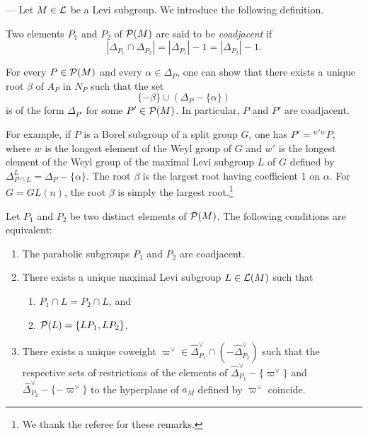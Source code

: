 \begin{paragr} --- Let $M\in \mathcal{L}$ be a Levi subgroup. We introduce the following definition.

\begin{definition}\label{def:coadj}
    Two elements $P_1$ and $P_2$ of $\mathcal{P}(M)$ are said to be \emph{coadjacent} if
$$|\Delta_{P_1}\cap \Delta_{P_2}|=|\Delta_{P_1}|-1=|\Delta_{P_2}|-1.$$
\end{definition}

\begin{remarque}\label{rem:coadj}
For every $P\in \mathcal{P}(M)$ and every $\alpha\in \Delta_P$, one can show that there exists a unique root $\beta$ of $A_P$ in $N_P$ such that the set
$$\{-\beta\}\cup (\Delta_P-\{\alpha\})$$
is of the form $\Delta_{P'}$ for some $P'\in \mathcal{P}(M)$. In particular, $P$ and $P'$ are coadjacent.

For example, if $P$ is a Borel subgroup of a split group $G$, one has $P'={}^{w'w}P$, where $w$ is the longest element of the Weyl group of $G$ and $w'$ is the longest element of the Weyl group of the maximal Levi subgroup $L$ of $G$ defined by $\Delta_{P\cap L}^L=\Delta_P-\{\alpha\}$. The root $\beta$ is the largest root having coefficient $1$ on $\alpha$. For $G=GL(n)$, the root $\beta$ is simply the largest root.\footnote{We thank the referee for these remarks.}
\end{remarque}

\begin{lemme}\label{lem:lesequi}
Let $P_1$ and $P_2$ be two distinct elements of $\mathcal{P}(M)$.
The following conditions are equivalent:
\begin{enumerate}
\item The parabolic subgroups $P_1$ and $P_2$ are coadjacent.
\item There exists a unique maximal Levi subgroup $L\in \mathcal{L}(M)$ such that
  \begin{enumerate}
  \item $P_1\cap L=P_2\cap L$, and
  \item $\mathcal{P}(L)=\{LP_1,LP_2\}$.
  \end{enumerate}
\item There exists a unique coweight $\varpi^\vee\in \hat{\Delta}^\vee_{P_1}\cap(-\hat{\Delta}^\vee_{P_2})$ such that the respective sets of restrictions of the elements of $\hat{\Delta}_{P_1}^\vee-\{\varpi^\vee\}$ and $\hat{\Delta}_{P_2}^\vee-\{-\varpi^\vee\}$ to the hyperplane of $a_M$ defined by $\varpi^\vee$ coincide.
\end{enumerate}
\end{lemme}


\end{paragr}
